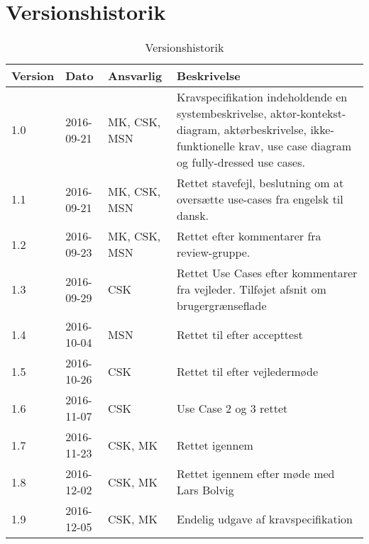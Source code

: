 \chapter{Versionshistorik}\label{Versionshistorik}

\begin{table}[htb]
\begin{tabular}{ | l | l | l | p{} | }
  \hline
  \textbf{Version} & \textbf{Dato} & \textbf{Ansvarlig} & \textbf{Beskrivelse} \\ \hline
  1.0 & 2016-09-21 & MK, CSK, MSN & Kravspecifikation indeholdende en systembeskrivelse, aktør-kontekst-diagram, aktørbeskrivelse, ikke-funktionelle krav, use case diagram og fully-dressed use cases.\\ \hline
  1.1 & 2016-09-21 & MK, CSK, MSN & Rettet stavefejl, beslutning om at oversætte use-cases fra engelsk til dansk. \\ \hline
  1.2 & 2016-09-23 & MK, CSK, MSN & Rettet efter kommentarer fra review-gruppe. \\\hline
  1.3 & 2016-09-29 & CSK & Rettet Use Cases efter kommentarer fra vejleder. Tilføjet afsnit om brugergrænseflade \\\hline
  1.4 & 2016-10-04 & MSN & Rettet til efter accepttest \\\hline
  1.5 & 2016-10-26 & CSK & Rettet til efter vejledermøde \\\hline
  1.6 & 2016-11-07 & CSK & Use Case 2 og 3 rettet \\\hline
  1.7 & 2016-11-23 & CSK, MK & Rettet igennem \\\hline
  1.8 & 2016-12-02 & CSK, MK & Rettet igennem efter møde med Lars Bolvig \\\hline
  1.9 & 2016-12-05 & CSK, MK & Endelig udgave af kravspecifikation\\\hline
\end{tabular}
\caption{Versionshistorik}
\end{table}
